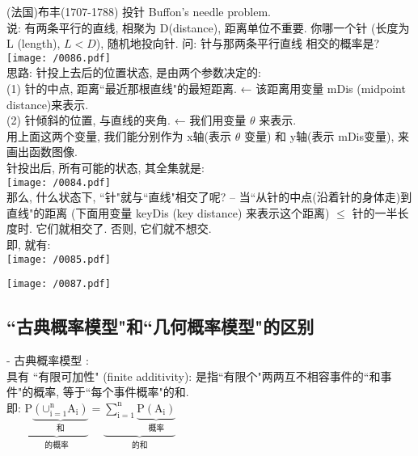 \documentclass[UTF8]{ctexart}
\begin{document}
\begin{myEnvSample}
	(法国)布丰(1707-1788) 投针 Buffon's needle problem. \\
说: 有两条平行的直线, 相聚为 D(distance), 距离单位不重要. 你哪一个针 (长度为 L (length), $L<D$), 随机地投向针. 问: 针与那两条平行直线 相交的概率是? \\

\texttt{[image: /0086.pdf]} \\

	思路: 针投上去后的位置状态, 是由两个参数决定的: \\
(1) 针的中点, 距离``最近那根直线"的最短距离. ← 该距离用变量 mDis (midpoint distance)来表示. \\
(2) 针倾斜的位置, 与直线的夹角. ← 我们用变量 $\theta$ 来表示.  \\
用上面这两个变量, 我们能分别作为 x轴(表示 $\theta$ 变量) 和 y轴(表示 mDis变量), 来画出函数图像. \\
		
	针投出后, 所有可能的状态, 其全集就是: \\
\texttt{[image: /0084.pdf]} \\
			
	那么, 什么状态下, ``针"就与``直线"相交了呢? -- 当``从针的中点(沿着针的身体走)到直线"的距离 (下面用变量 keyDis (key distance) 来表示这个距离) $\leq$ 针的一半长度时. 它们就相交了. 否则, 它们就不想交. \\
	即, 就有: \\	
\texttt{[image: /0085.pdf]}

\texttt{[image: /0087.pdf]}
\end{myEnvSample} 






\subsection{``古典概率模型"和``几何概率模型"的区别}

- 古典概率模型 : \\
具有 ``有限可加性" (finite additivity): 是指``有限个"两两互不相容事件的``和事件"的概率, 等于``每个事件概率"的和. \\
即: $
\underset{\text{的概率}}{\underbrace{\text{P}\underset{\text{和}}{\underbrace{\left( \text{∪}_{\text{i}=1}^{\text{n}}\text{A}_{\text{i}} \right) }}}}=\underset{\text{的和}}{\underbrace{\sum_{\text{i}=1}^{\text{n}}{\underset{\text{概率}}{\underbrace{\text{P}\left( \text{A}_{\text{i}} \right) }}}}}
$ \\
\\
\end{document}
